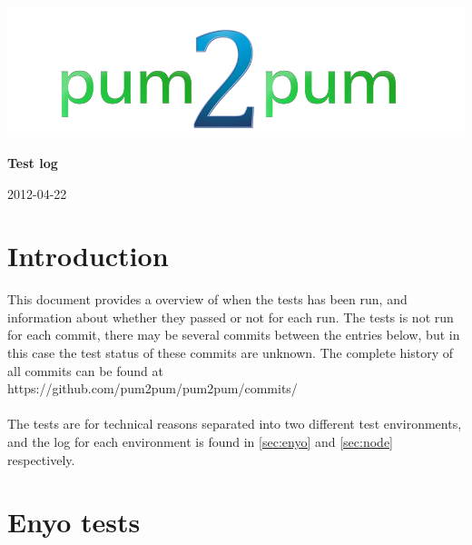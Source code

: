\documentclass[a4paper, 12pt, titlepage]{article}
\begin{document}
	
	\begin{titlepage}
		
		\includegraphics[scale=0.4]{logoNormal.png}
		
		\vspace{6cm}
		
		\begin{center}
			\Huge{\textbf{Test log}} %
			
			\vspace{0.5cm}
			
			\huge{2012-04-22} %
		\end{center}
		
	\end{titlepage}
	
	\newpage


	\section{Introduction}
	This document provides a overview of when the tests has been run, and  information about whether they passed or not for each run. The tests is not run for each commit, there may be several commits between the entries below, but in this case the test status of these commits are unknown. The complete history of all commits can be found at\\

	https://github.com/pum2pum/pum2pum/commits/\\\\
	The tests are for technical reasons separated into two different test environments, and the log for each environment is found in \autoref{sec:enyo} and \autoref{sec:node} respectively.\\


	\section{Enyo tests}
	\label{sec:enyo}
\end{document}
